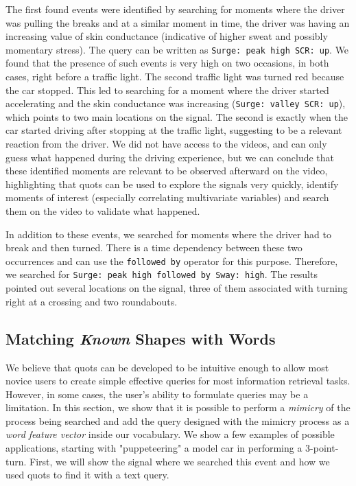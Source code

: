 The first found events were identified by searching for moments where the driver was pulling the breaks and at a similar moment in time, the driver was having an increasing value of skin conductance (indicative of higher sweat and possibly momentary stress). The query can be written as \texttt{Surge: peak high SCR: up}. We found that the presence of such events is very high on two occasions, in both cases, right before a traffic light. The second traffic light was turned red because the car stopped. This led to searching for a moment where the driver started accelerating and the skin conductance was increasing (\texttt{Surge: valley SCR: up}), which points to two main locations on the signal. The second is exactly when the car started driving after stopping at the traffic light, suggesting to be a relevant reaction from the driver. We did not have access to the videos, and can only guess what happened during the driving experience, but we can conclude that these identified moments are relevant to be observed afterward on the video, highlighting that \gls{quots} can be used to explore the signals very quickly, identify moments of interest (especially correlating multivariate variables) and search them on the video to validate what happened. 
\par
In addition to these events, we searched for moments where the driver had to break and then turned. There is a time dependency between these two occurrences and can use the \texttt{followed by} operator for this purpose. Therefore, we searched for \texttt{Surge: peak high followed by Sway: high}. The results pointed out several locations on the signal, three of them associated with turning right at a crossing and two roundabouts.

\subsection{Matching \textit{Known} Shapes with Words}

We believe that \gls{quots} can be developed to be intuitive enough to allow most novice users to create simple effective queries for most information retrieval tasks.  However, in some cases, the user’s ability to formulate queries may be a limitation. In this section, we show that it is possible to perform a \textit{mimicry} of the process being searched and add the query designed with the mimicry process as a \textit{word feature vector} inside our vocabulary. We show a few examples of possible applications, starting with "puppeteering" a model car in performing a 3-point-turn. First, we will show the signal where we searched this event and how we used \gls{quots} to find it with a text query.


